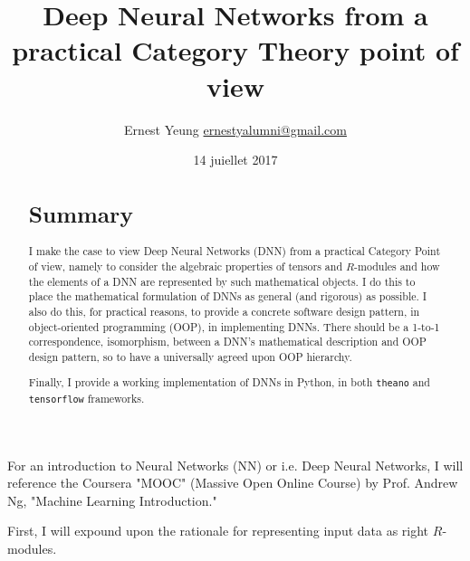 \documentclass[10pt]{amsart}
\title[Deep Neural Networks from a practical Category Theory point of view)]{Deep Neural Networks from a practical Category Theory point of view}
\author{Ernest Yeung \href{mailto:ernestyalumni@gmail.com}{ernestyalumni@gmail.com}}
\date{14 juiellet 2017}
\begin{document}

\maketitle

\tableofcontents



 











\begin{abstract}
\section{Summary}
I make the case to view Deep Neural Networks (DNN) from a practical Category Point of view, namely to consider the algebraic properties of tensors and $R$-modules and how the elements of a DNN are represented by such mathematical objects.  I do this to place the mathematical formulation of DNNs as general (and rigorous) as possible.  I also do this, for practical reasons, to provide a concrete software design pattern, in object-oriented programming (OOP), in implementing DNNs.  There should be a 1-to-1 correspondence, isomorphism, between a DNN's mathematical description and OOP design pattern, so to have a universally agreed upon OOP hierarchy.  

Finally, I provide a working implementation of DNNs in Python, in both \verb|theano| and \verb|tensorflow| frameworks.  
\end{abstract}



For an introduction to Neural Networks (NN) or i.e. Deep Neural Networks, I will reference the Coursera "MOOC" (Massive Open Online Course) by Prof. Andrew Ng, "Machine Learning Introduction."\cite{AnNg}

First, I will expound upon the rationale for representing input data as right $R$-modules.  
\end{document}
